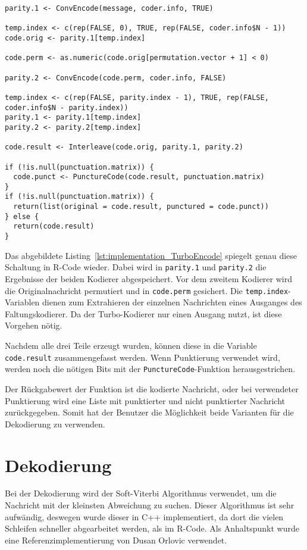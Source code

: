 \begin{lstlisting}[caption=Implementierung von \texttt{TurboEncode}, label={lst:implementation_TurboEncode}, float=!th]
parity.1 <- ConvEncode(message, coder.info, TRUE)

temp.index <- c(rep(FALSE, 0), TRUE, rep(FALSE, coder.info$N - 1))
code.orig <- parity.1[temp.index]

code.perm <- as.numeric(code.orig[permutation.vector + 1] < 0)

parity.2 <- ConvEncode(code.perm, coder.info, FALSE)

temp.index <- c(rep(FALSE, parity.index - 1), TRUE, rep(FALSE, coder.info$N - parity.index))
parity.1 <- parity.1[temp.index]
parity.2 <- parity.2[temp.index]

code.result <- Interleave(code.orig, parity.1, parity.2)

if (!is.null(punctuation.matrix)) {
  code.punct <- PunctureCode(code.result, punctuation.matrix)
}
if (!is.null(punctuation.matrix)) {
  return(list(original = code.result, punctured = code.punct))
} else {
  return(code.result)
}
\end{lstlisting}

Das abgebildete Listing~\ref{lst:implementation_TurboEncode} spiegelt genau diese Schaltung in R-Code wieder. Dabei wird in \texttt{parity.1} und \texttt{parity.2} die Ergebnisse der beiden Kodierer abgespeichert. Vor dem zweitem Kodierer wird die Originalnachricht permutiert und in \texttt{code.perm} gesichert. Die \texttt{temp.index}-Variablen dienen zum Extrahieren der einzelnen Nachrichten eines Ausganges des Faltungskodierer. Da der Turbo-Kodierer nur einen Ausgang nutzt, ist diese Vorgehen nötig.

Nachdem alle drei Teile erzeugt wurden, können diese in die Variable \texttt{code.result} zusammengefasst werden. Wenn Punktierung verwendet wird, werden noch die nötigen Bits mit der \texttt{PunctureCode}-Funktion herausgestrichen. 

Der Rückgabewert der Funktion ist die kodierte Nachricht, oder bei verwendeter Punktierung wird eine Liste mit punktierter und nicht punktierter Nachricht zurückgegeben. Somit hat der Benutzer die Möglichkeit beide Varianten für die Dekodierung zu verwenden.  

\FloatBarrier
\section{Dekodierung}
\label{sec:implementation_decode}
Bei der Dekodierung wird der Soft-Viterbi Algorithmus verwendet, um die Nachricht mit der kleinsten Abweichung zu suchen. Dieser Algorithmus ist sehr aufwändig, deswegen wurde dieser in C++ implementiert, da dort die vielen Schleifen schneller abgearbeitet werden, als im R-Code. Als Anhaltspunkt wurde eine Referenzimplementierung von Dusan Orlovic \cite{SOVA} verwendet.

